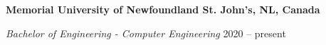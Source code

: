 \begin{itemize}
\textbf{Memorial University of Newfoundland \hfill St. John's, NL, Canada} \par
\textit{Bachelor of Engineering - Computer Engineering} \hfill 2020 -- present\par
\end{itemize}\vspace{0.1cm}\par